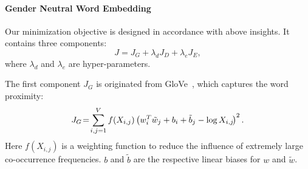 

\paragraph{Gender Neutral Word Embedding}
Our minimization objective is designed in accordance with above insights. It contains three components: \begin{equation}
\label{eq:full_loss}
  J = J_G + \lambda_d J_D +\lambda_e J_E,
\end{equation}
where $\lambda_d$ and $\lambda_e$ are hyper-parameters. 



The first component $J_G$ is originated from GloVe~\cite{glove}, which captures the word proximity:
\begin{equation*}
    J_G \!=\! \sum_{i,j=1}^{V}f(X_{i,j})\left(w_i^T\tilde{w}_j + b_i + \tilde{b}_j -\log X_{i,j}\!\right)^2.
    \vspace{-2pt}
\end{equation*}
Here $f(X_{i,j})$ is a weighting function to reduce the influence of extremely large co-occurrence frequencies. $b$ and $\tilde{b}$ are the respective linear biases for $w$ and $\tilde{w}$. 

